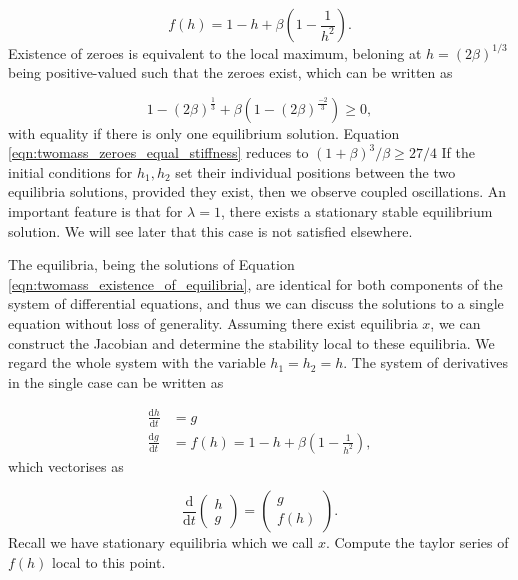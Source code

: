 \documentclass{article}
\begin{document}

\begin{equation}
    f(h) = 1 - h + \beta \left( 1 - \frac{1}{h^2} \right).
    \label{eqn:twomass_existence_of_equilibria}
\end{equation}
Existence of zeroes is equivalent to the local maximum, beloning at \(h = \left( 2\beta \right)^{1/3}\) being positive-valued such that the zeroes exist,
which can be written as

\begin{equation}
    1 - \left(2\beta\right)^\frac{1}{3} + \beta\left( 1 - (2\beta)^\frac{-2}{3} \right) \ge 0,
    \label{eqn:twomass_zeroes_equal_stiffness}
\end{equation}
with equality if there is only one equilibrium solution.
Equation \ref{eqn:twomass_zeroes_equal_stiffness} reduces to \((1+\beta)^3/\beta \ge 27/4\)
If the initial conditions for \(h_1, h_2\) set their individual positions between the two equilibria solutions,
provided they exist,
then we observe coupled oscillations.
An important feature is that for \(\lambda = 1\), there exists a stationary stable equilibrium solution.
We will see later that this case is not satisfied elsewhere.

The equilibria, being the solutions of Equation \ref{eqn:twomass_existence_of_equilibria}, are identical for both components of the system of differential equations,
and thus we can discuss the solutions to a single equation without loss of generality.
Assuming there exist equilibria \(x\), 
we can construct the Jacobian and determine the stability local to these equilibria.
We regard the whole system with the variable \(h_1=h_2=h\).
The system of derivatives in the single case can be written as

\begin{equation}
    \begin{aligned}
        \frac{\mathrm{d}h}{\mathrm{d}t} &= g \\
        \frac{\mathrm{d}g}{\mathrm{d}t} &= f(h) = 1-h +\beta\left(1-\frac{1}{h^2}\right),
    \end{aligned}
\end{equation}
which vectorises as

\begin{equation}
    \frac{\mathrm{d}}{\mathrm{d}t} \begin{pmatrix}
        h \\
        g
    \end{pmatrix} = \begin{pmatrix}
        g \\
        f(h)
    \end{pmatrix}.
\end{equation}
Recall we have stationary equilibria which we call \(x\). Compute the taylor series of \(f(h)\) local to this point.
\end{document}
